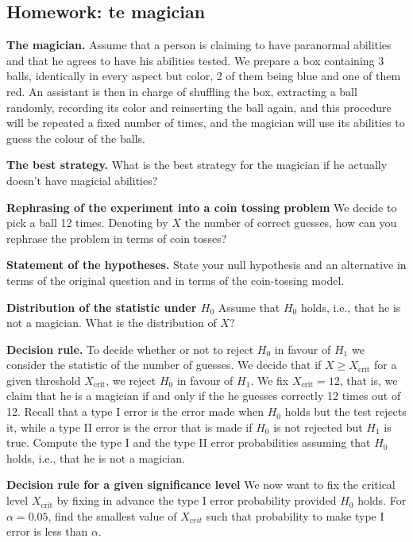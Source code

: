 	\subsection{Homework: te magician}
	\begin{ExerciseList}
	
	
\Exercise \textbf{The magician.}
	 Assume that a person is claiming to have paranormal abilities and that he agrees to have his abilities tested. We prepare a box containing 3 balls, identically in every aspect but color, 2 of them being blue and one of them red. An assistant is then in charge of shuffling the box, extracting a ball randomly, recording its color and reinserting the ball again, and this procedure will be repeated a fixed number of times, and the magician will use its abilities to guess the colour of the balls.   
	
	\Question  \textbf{The best strategy.} What is the best strategy for the magician if he actually doesn't have magicial abilities?
	
	\Question \textbf{ Rephrasing of the experiment into a coin tossing problem} We decide to pick a ball 12 times.  Denoting by $X$ the number of correct guesses, how can you rephrase the problem in terms of coin tosses?
	
	\Question \textbf{ Statement of the hypotheses.} State your null hypothesis and an alternative in terms of the original question and in terms of the coin-tossing model.
	
	\Question \textbf{Distribution of the statistic under $H_0$} Assume that $H_0$ holds, i.e., that he is not a magician. What is the distribution of $X$? 

	\Question \textbf{Decision rule.} To decide whether or not to reject $H_0$ in favour of $H_1$ we consider the statistic of the number of guesses. We decide that if $X \geq X_{\text{crit}}$ for a given threshold $X_{\text{crit}}$, we reject $H_0$ in favour of $H_1$. We fix $X_{\text{crit}} = 12$, that is, we claim that he is a magician if and only if the he guesses correctly 12 times out of 12. Recall that a type I error is the error made when $H_0$ holds but the test rejects it, while a type II error is the error that is made if $H_0$ is not rejected but $H_1$ is true. Compute the type I and the type II error probabilities assuming that $H_0$ holds, i.e., that he is not a magician.  

	\Question \textbf{ Decision rule for a given significance level}
	\Answer We now want to fix the critical level $X_{\text{crit}}$ by fixing in advance the type I error probability provided $H_0$ holds. For $\alpha = 0.05$, find the smallest value of $X_{crit}$ such that probability to make type I error is less than $\alpha$.


\end{ExerciseList}
